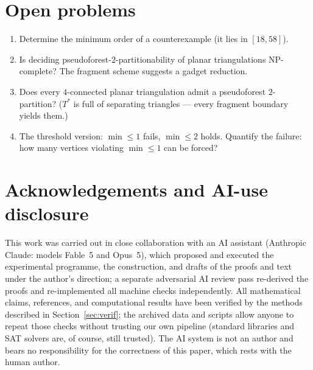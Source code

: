 \documentclass[11pt]{article}
\theoremstyle{remark}
\begin{document}
\section{Open problems}

\begin{enumerate}
\item Determine the minimum order of a counterexample (it lies in
$[18,58]$).
\item Is deciding pseudoforest-$2$-partitionability of planar
triangulations NP-complete? The fragment scheme suggests a gadget
reduction.
\item Does every $4$-connected planar triangulation admit a pseudoforest
$2$-partition? ($T^{*}$ is full of separating triangles --- every
fragment boundary yields them.)
\item The threshold version: $\min\le 1$ fails, $\min\le 2$ holds.
Quantify the failure: how many vertices violating $\min\le 1$ can be
forced?
\end{enumerate}

\section*{Acknowledgements and AI-use disclosure}

This work was carried out in close collaboration with an AI assistant
(Anthropic Claude: models Fable~5 and Opus~5), which proposed and
executed the experimental programme, the construction, and drafts of the
proofs and text under the author's direction; a separate adversarial AI
review pass re-derived the proofs and re-implemented all machine checks
independently. All mathematical claims, references, and computational
results have been verified by the methods described in Section~\ref{sec:verif}; the
archived data and scripts allow anyone to repeat those checks without
trusting our own pipeline (standard libraries and SAT solvers are, of
course, still trusted). The AI system is not an author and bears no
responsibility for the correctness of this paper, which rests with the
human author.
\end{document}
